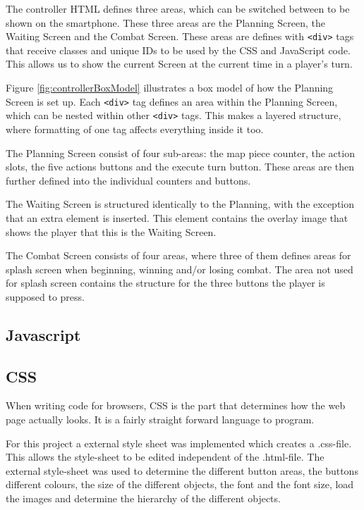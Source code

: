 The controller HTML defines three areas, which can be switched between to be shown on the smartphone. These three areas are the Planning Screen, the Waiting Screen and the Combat Screen. These areas are defines with \texttt{<div>} tags that receive classes and unique IDs to be used by the CSS and JavaScript code. This allows us to show the current Screen at the current time in a player's turn.

Figure \ref{fig:controllerBoxModel} illustrates a box model of how the Planning Screen is set up. Each \texttt{<div>} tag defines an area within the Planning Screen, which can be nested within other \texttt{<div>} tags. This makes a layered structure, where formatting of one tag affects everything inside it too.

The Planning Screen consist of four sub-areas: the map piece counter, the action slots, the five actions buttons and the execute turn button. These areas are then further defined into the individual counters and buttons.

The Waiting Screen is structured identically to the Planning, with the exception that an extra element is inserted. This element contains the overlay image that shows the player that this is the Waiting Screen.

The Combat Screen consists of four areas, where three of them defines areas for splash screen when beginning, winning and/or losing combat. The area not used for splash screen contains the structure for the three buttons the player is supposed to press.

\subsection{Javascript}\label{controllerJavascript}


\subsection{CSS}\label{controllerCSS}
When writing code for browsers, CSS is the part that determines how the web page actually looks. It is a fairly straight forward language to program. 

For this project a external style sheet was implemented which creates a .css-file. This allows the style-sheet to be edited independent of the .html-file. The external style-sheet was used to determine the different button areas, the buttons different colours, the size of the different objects, the font and the font size, load the images and determine the hierarchy of the different objects. 
